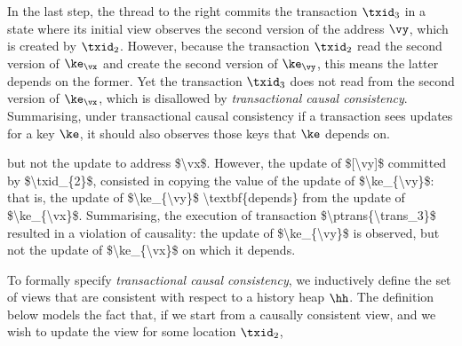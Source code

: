 
In the last step, the thread to the right commits the transaction $\txid_3$ in a state where its initial view observes the second version of the address $\vy$, which is created by \( \txid_{2} \).
However, because the transaction \( \txid_{2} \) read the second version of \( \ke_\vx \) and create the second version of \( \ke_\vy \), this means the latter depends on the former.
Yet the transaction \( \txid_{3} \) does not read from the second version of \( \ke_\vx \), which is disallowed by \emph{transactional causal consistency}.
Summarising, under transactional causal consistency if a transaction sees updates for a key \( \ke \), it should also observes those keys that \( \ke \) depends on.

\ac{
but not the update to address $\vx$.
However, the update of $[\vy]$ committed by $\txid_{2}$, consisted in copying the value of the update 
of $\ke_{\vy}$: that is, the update of $\ke_{\vy}$ \textbf{depends} from the update of $\ke_{\vx}$. 
Summarising, the execution of transaction $\ptrans{\trans_3}$ resulted in a violation of 
causality: the update of $\ke_{\vy}$ is observed, but not the update of $\ke_{\vx}$ on which 
it depends.
}

To formally specify \emph{transactional causal consistency}, we inductively define the set of views that are consistent with respect to a history heap $\hh$. 
The definition below models the fact that, if we start from a causally consistent view, and we wish to update the view for some location $\txid_2$, 

